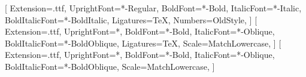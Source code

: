 %
%
%

\usepackage{iftex}
\RequireXeTeX

\usepackage{fontspec}

%
\setmainfont{CharisSIL}[
  Extension=.ttf,
  UprightFont=*-Regular,
  BoldFont=*-Bold,
  ItalicFont=*-Italic,
  BoldItalicFont=*-BoldItalic,
  Ligatures=TeX,
  Numbers=OldStyle,
]
\setsansfont{DejaVuSans}[
  Extension=.ttf,
  UprightFont=*,
  BoldFont=*-Bold,
  ItalicFont=*-Oblique,
  BoldItalicFont=*-BoldOblique,
  Ligatures=TeX,
  Scale=MatchLowercase,
]
\setmonofont{DejaVuSansMono}[
  Extension=.ttf,
  UprightFont=*,
  BoldFont=*-Bold,
  ItalicFont=*-Oblique,
  BoldItalicFont=*-BoldOblique,
  Scale=MatchLowercase,
]

